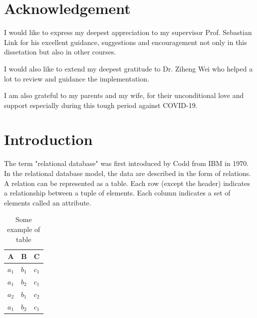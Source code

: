 \documentclass[11pt]{book}
\begin{document}
\chapter*{Acknowledgement}       
\setcounter{page}{2}
\pagestyle{headings}


I would like to express my deepest appreciation to my supervisor Prof. Sebastian Link for his excellent guidance, suggestions and encouragement not only in this dissetation but also in other courses.

I would also like to extend my deepest gratitude to Dr. Ziheng Wei who helped a lot to review and guidance the implementation.

I am also grateful to my parents and my wife, for their unconditional love and support especially during this tough period against COVID-19.



\setcounter{secnumdepth}{3}
\setcounter{tocdepth}{3}
\tableofcontents

	
\chapter{Introduction}

The term "relational database" was first introduced by Codd \cite{codd13f} from IBM in 1970. In the relational database model, the data are described in the form of relations. A relation can be represented as a table. Each row (except the header) indicates a relationship between a tuple of elements. Each column indicates a set of elements called an attribute.

\begin{table}[H]
	\centering
	
	\begin{tabular}{ c c c }
		A     & B     & C \\
		\hline
		$a_1$ & $b_1$ & $c_1$ \\ 
		$a_1$ & $b_2$ & $c_1$ \\ 
		$a_2$ & $b_1$ & $c_2$ \\
		$a_1$ & $b_2$ & $c_1$ \\
	\end{tabular}
	
	\caption{Some example of table}
	
	\label{example_table_1}
\end{table}
\end{document}
